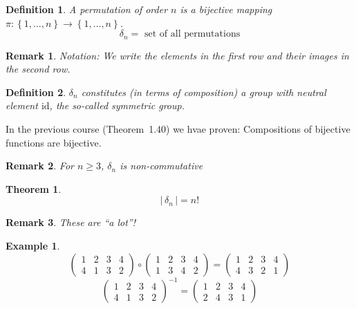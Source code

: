 \documentclass[a4paper,landscape,twocolumn]{article}
\newcommand\set[1]{\left\{#1\right\}}
\newcommand\card[1]{\left|\,#1\,\right|}
\newtheorem{theorem}{Theorem}
\newtheorem{defi}{Definition}
\newtheorem{ex}{Example}
\newtheorem{rem}{Remark}
\begin{document}
\begin{defi}
  \label{defi-7.8}
  A permutation of order $n$ is a bijective mapping $\pi: \set{1, \ldots, n} \to \set{1, \ldots, n}$.
  \[ \delta_n = \text{ set of all permutations} \]
\end{defi}
\begin{rem}
  Notation:
  We write the elements in the first row and their images in the second row.
\end{rem}
\begin{defi}
  \label{defi-7.9}
  $\delta_n$ constitutes (in terms of composition) a group with neutral element $\text{id}$,
  the so-called symmetric group.
\end{defi}

In the previous course (Theorem~1.40) we hvae proven: Compositions of bijective functions are bijective.
\begin{rem}
  For $n \geq 3$, $\delta_n$ is non-commutative
\end{rem}
\begin{theorem}
  \label{satz-7.10}
  \[ \card{\delta_n} = n! \]
\end{theorem}
\begin{rem}
  These are \enquote{a lot}!
\end{rem}
\begin{ex}
  \label{example-7.11}
  \[
    \begin{pmatrix}
      1 & 2 & 3 & 4 \\
      4 & 1 & 3 & 2
    \end{pmatrix} \circ \begin{pmatrix}
      1 & 2 & 3 & 4 \\
      1 & 3 & 4 & 2
    \end{pmatrix}
    = \begin{pmatrix}
      1 & 2 & 3 & 4 \\
      4 & 3 & 2 & 1
    \end{pmatrix}
  \] \[
    \begin{pmatrix}
      1 & 2 & 3 & 4 \\
      4 & 1 & 3 & 2
    \end{pmatrix}^{-1}
    = \begin{pmatrix}
      1 & 2 & 3 & 4 \\
      2 & 4 & 3 & 1
    \end{pmatrix}
  \]
\end{ex}
\end{document}
